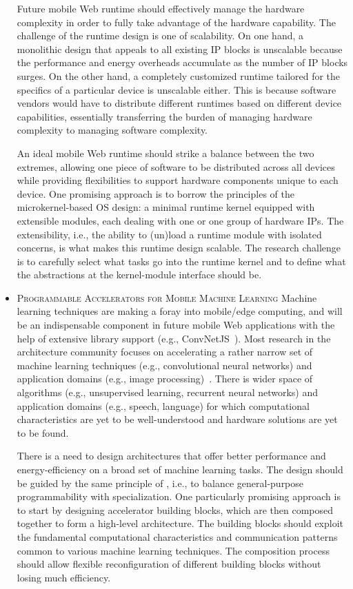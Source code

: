 \begin{itemize}
  Future mobile Web runtime should effectively manage the hardware complexity in order to fully take advantage of the hardware capability. The challenge of the runtime design is one of scalability. On one hand, a monolithic design that appeals to all existing IP blocks is unscalable because the performance and energy overheads accumulate as the number of IP blocks surges. On the other hand, a completely customized runtime tailored for the specifics of a particular device is unscalable either. This is because software vendors would have to distribute different runtimes based on different device capabilities, essentially transferring the burden of managing hardware complexity to managing software complexity.
  
  An ideal mobile Web runtime should strike a balance between the two extremes, allowing one piece of software to be distributed across all devices while providing flexibilities to support hardware components unique to each device. One promising approach is to borrow the principles of the microkernel-based OS design: a minimal runtime kernel equipped with extensible modules, each dealing with one or one group of hardware IPs. The extensibility, i.e., the ability to (un)load a runtime module with isolated concerns, is what makes this runtime design scalable. The research challenge is to carefully select what tasks go into the runtime kernel and to define what the abstractions at the kernel-module interface should be.
  
  \item \textsc{Programmable Accelerators for Mobile Machine Learning} Machine learning techniques are making a foray into mobile/edge computing, and will be an indispensable component in future mobile Web applications with the help of extensive library support (e.g., ConvNetJS~\cite{convnetjs}). Most research in the architecture community focuses on accelerating a rather narrow set of machine learning techniques (e.g., convolutional neural networks) and application domains (e.g., image processing)~\cite{fathom}. There is wider space of algorithms (e.g., unsupervised learning, recurrent neural networks) and application domains (e.g., speech, language) for which computational characteristics are yet to be well-understood and hardware solutions are yet to be found.
    
  There is a need to design architectures that offer better performance and energy-efficiency on a broad set of machine learning tasks. The design should be guided by the same principle of \webcore, i.e., to balance general-purpose programmability with specialization. One particularly promising approach is to start by designing accelerator building blocks, which are then composed together to form a high-level architecture. The building blocks should exploit the fundamental computational characteristics and communication patterns common to various machine learning techniques. The composition process should allow flexible reconfiguration of different building blocks without losing much efficiency.
  

\end{itemize}
